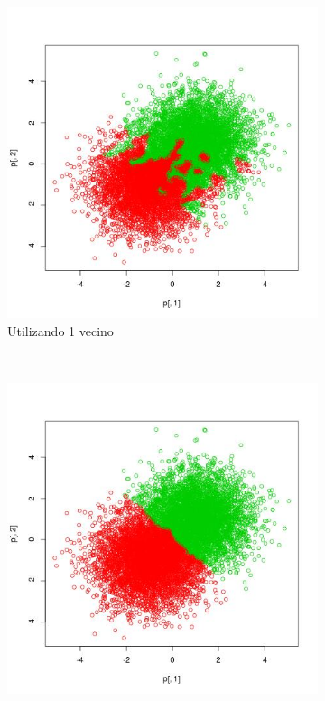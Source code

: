 \documentclass[12pt, a4paper]{article}
\begin{document}
\begin{figure}
    \centering

    \begin{subfigure}[b]{0.45\textwidth}
        \includegraphics[width=\textwidth]{pred1vecino}
        \caption{Utilizando 1 vecino}
    \end{subfigure}
      ~ %
    \begin{subfigure}[b]{0.45\textwidth}
        \includegraphics[width=\textwidth]{pred80vecino}

\end{subfigure}
\end{figure}
\end{document}
